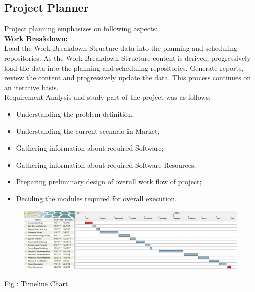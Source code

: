 \documentclass[12pt,a4paper]
{article}
\numberwithin{table}{section}
\begin{document}
{{{{{{{{{\begin{appendices}
\section{Project Planner}
\label{app:plan}
Project planning emphasizes on following aspects: \\
\textbf{{Work Breakdown:}} \\
\hspace{0.5 in} Load the Work Breakdown Structure data into the planning and scheduling repositories. As the Work Breakdown Structure content is derived, progressively load the data into the planning and scheduling repositories. Generate reports, review the content and progressively update the data. This process continues on an iterative basis.\\
 Requirement Analysis and study part of the project was as follows:
\begin{itemize}
\item Understanding the problem definition;
\item Understanding the current scenario in Market;
\item Gathering information about required Software;
\item Gathering information about required Software Resources;
\item Preparing preliminary design of overall work flow of project;
\item Deciding the modules required for overall execution.
\end{itemize}

\begin{center}
	  \begin{figure}[h]
			\centering
			\includegraphics[width=17 cm , height= 8 cm]{TC.png}
		
		\end{figure}
		Fig : Timeline Chart
	\end{center}
\newpage
\begin{minipage}{18cm}
\vspace{4 in}
 \begin{center} 
\begin{Huge}


\end{Huge}
\end{center}
\end{minipage}
\end{appendices}}}}}}}}}}
\end{document}
